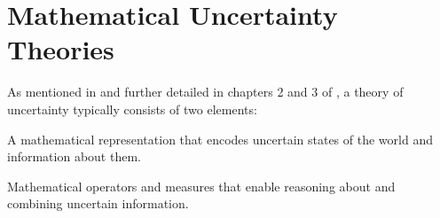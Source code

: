 \section{Mathematical Uncertainty Theories}

As mentioned in \cite{uncertaintymeasuresbigpicture} and further detailed in chapters 2 and 3 of \cite{UncertaintySciences}, a theory of uncertainty typically consists of two elements:

\begin{romanenum}
    \item A mathematical representation that encodes uncertain states of the world and information about them.
    \item Mathematical operators and measures that enable reasoning about and combining uncertain information.
\end{romanenum}
\\



